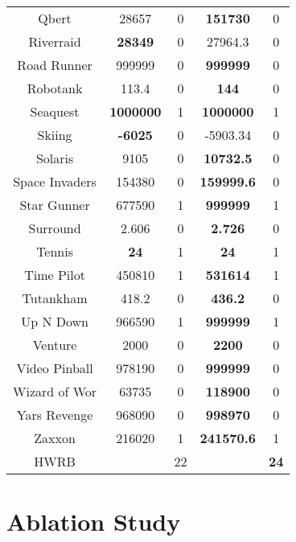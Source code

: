 \begin{table}[!hb]
\begin{center}
\begin{tabular}{c cc cc }
        Qbert &28657          & 0 & \textbf{151730} & 0 \\  
        Riverraid &\textbf{28349}           & 0 & 27964.3 & 0 \\   
        Road Runner &{999999	} & 0  & \textbf{999999} &0 \\   
        Robotank &113.4           & 0 & \textbf{144} & 0 \\  
        Seaquest&\textbf{{1000000}}         & 1 & \textbf{1000000} & 1 \\  
        Skiing &\textbf{{-6025}}  & 0 & -5903.34 & 0 \\  
        Solaris &9105           & 0  & \textbf{10732.5} & 0 \\   
        Space Invaders  &{154380}         & 0 & \textbf{159999.6} & 0 \\  
        Star Gunner &{677590}         & 1 & \textbf{999999} & 1 \\  
        Surround  &2.606           & 0  & \textbf{2.726} & 0 \\  
        Tennis &\textbf{{24}}            & 1  & \textbf{24} & 1 \\   
        Time Pilot &450810	         & 1  & \textbf{531614} & 1 \\   
        Tutankham &418.2          & 0 & \textbf{436.2} & 0 \\   
        Up N Down &966590         & 1 & \textbf{999999} & 1\\  
        Venture  &2000	           & 0 & \textbf{2200} & 0 \\    
        Video Pinball &978190          & 0 & \textbf{999999} &0 \\  
        Wizard of Wor  &63735         & 0 & \textbf{118900} & 0 \\  
        Yars Revenge &968090         & 0& \textbf{998970} & 0 \\  
        Zaxxon &216020	          & 1 & \textbf{241570.6} & 1 \\  \midrule
                 HWRB & &22   & &\textbf{24} \\ 
         \bottomrule
\end{tabular}
\end{center}
\end{table}



\clearpage

\section{Ablation Study}
\label{app: Ablation Study}


